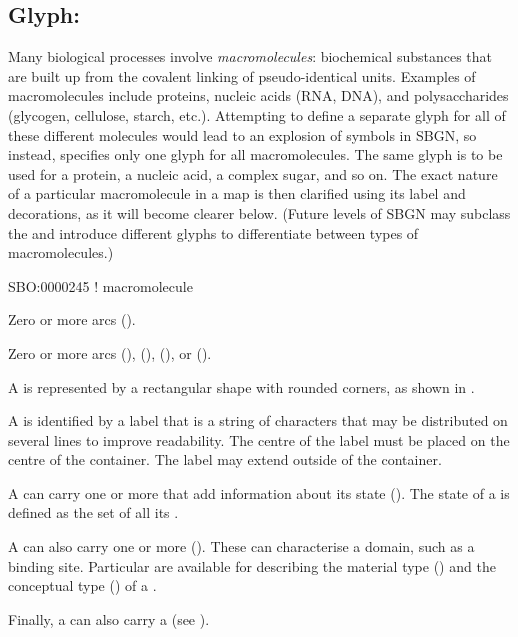\subsection{Glyph: }
\label{sec:macromolecule}

Many biological processes involve \emph{macromolecules}: biochemical substances that are built up from the covalent linking of pseudo-identical units.
Examples of macromolecules include proteins, nucleic acids (RNA, DNA), and polysaccharides (glycogen, cellulose, starch, etc.).
Attempting to define a separate glyph for all of these different molecules would lead to an explosion of symbols in SBGN, so instead, \SBGNPDLone specifies only one glyph for all macromolecules.
The same glyph is to be used for a protein, a nucleic acid, a complex sugar, and so on.
The exact nature of a particular macromolecule in a map is then clarified using its label and decorations, as it will become clearer below.
% 
(Future levels of SBGN may subclass the  and introduce different glyphs to differentiate between types of macromolecules.)

\begin{glyphDescription}

\glyphSboTerm
SBO:0000245 ! macromolecule

\glyphIncoming
Zero or more  arcs ().

\glyphOutgoing
Zero or more  arcs (),  (),  (), or  ().

\glyphContainer
A  is represented by a rectangular shape with rounded corners, as shown in .

\glyphLabel
A  is identified by a label  that is a string of characters that may be distributed on several lines to improve readability.
The centre of the label must be placed on the centre of the container.
The label may extend outside of the container.

\glyphAux
A  can carry one or more  that add information about its state ().
The state of a  is defined as the set of all its .

A  can also carry one or more  ().
These can characterise a domain, such as a binding site.
Particular  are available for describing the material type () and the conceptual type () of a .

Finally, a  can also carry a  (see ).

\end{glyphDescription}

